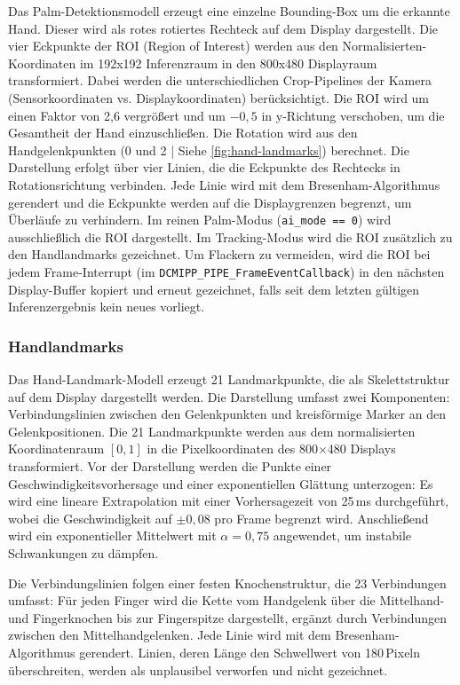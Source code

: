 Das Palm-Detektionsmodell erzeugt eine einzelne Bounding-Box um die erkannte Hand. Dieser wird als rotes rotiertes Rechteck auf dem Display dargestellt. Die vier Eckpunkte der ROI (Region of Interest) werden aus den Normalisierten-Koordinaten im 192x192 Inferenzraum in den 800x480 Displayraum transformiert. Dabei werden die unterschiedlichen Crop-Pipelines der Kamera (Sensorkoordinaten vs. Displaykoordinaten) berücksichtigt. Die ROI wird um einen Faktor von 2{,}6 vergrößert und um $-0{,}5$ in y-Richtung verschoben, um die Gesamtheit der Hand einzuschließen. Die Rotation wird aus den Handgelenkpunkten (0 und 2 | Siehe \ref{fig:hand-landmarks}) berechnet. Die Darstellung erfolgt über vier Linien, die die Eckpunkte des Rechtecks in Rotationsrichtung verbinden. Jede Linie wird mit dem Bresenham-Algorithmus gerendert und die Eckpunkte werden auf die Displaygrenzen begrenzt, um Überläufe zu verhindern. Im reinen Palm-Modus (\texttt{ai\_mode == 0}) wird ausschließlich die ROI dargestellt. Im Tracking-Modus wird die ROI zusätzlich zu den Handlandmarks gezeichnet. Um Flackern zu vermeiden, wird die ROI bei jedem Frame-Interrupt (im \texttt{DCMIPP\_PIPE\_FrameEventCallback}) in den nächsten Display-Buffer kopiert und erneut gezeichnet, falls seit dem letzten gültigen Inferenzergebnis kein neues vorliegt.

\subsubsection{Handlandmarks}\label{ssub:darstellung-landmarks}

Das Hand-Landmark-Modell erzeugt 21 Landmarkpunkte, die als Skelettstruktur auf dem Display dargestellt werden. Die Darstellung umfasst zwei Komponenten: Verbindungslinien zwischen den Gelenkpunkten und kreisförmige Marker an den Gelenkpositionen. Die 21 Landmarkpunkte werden aus dem normalisierten Koordinatenraum \([0,1]\) in die Pixelkoordinaten des 800$\times$480 Displays transformiert. Vor der Darstellung werden die Punkte einer Geschwindigkeitsvorhersage und einer exponentiellen Glättung unterzogen: Es wird eine lineare Extrapolation mit einer Vorhersagezeit von 25\,ms durchgeführt, wobei die Geschwindigkeit auf $\pm 0{,}08$ pro Frame begrenzt wird. Anschließend wird ein exponentieller Mittelwert mit $\alpha = 0{,}75$ angewendet, um instabile Schwankungen zu dämpfen.

Die Verbindungslinien folgen einer festen Knochenstruktur, die 23 Verbindungen umfasst: Für jeden Finger wird die Kette vom Handgelenk über die Mittelhand- und Fingerknochen bis zur Fingerspitze dargestellt, ergänzt durch Verbindungen zwischen den Mittelhandgelenken. Jede Linie wird mit dem Bresenham-Algorithmus gerendert. Linien, deren Länge den Schwellwert von 180\,Pixeln überschreiten, werden als unplausibel verworfen und nicht gezeichnet.

